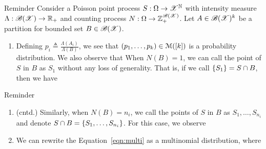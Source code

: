 \documentclass[12pt,aspectratio=169]{beamer}
\begin{document}
\begin{frame}
\begin{block}{Reminder}
Consider a Poisson point process $S:\Omega\to\mathscr{X}^{\mathbb{N}}$ with intensity measure $\Lambda: \mathscr{B}(\mathscr{X}) \to \mathbb{R}_+$ and counting process $N:\Omega\to\mathbb{Z}_+^{\mathscr{B}(\mathscr{X})}$. 
Let $A \in \mathscr{B}(\mathscr{X})^k$ be a partition for bounded set $B \in \mathscr{B}(\mathscr{X})$.  
\begin{enumerate}[i\_]
\item Defining $p_i \triangleq \frac{\Lambda(A_i)}{\Lambda(B)}$, we see that $(p_1, \dots, p_k) \in \mathcal{M}([k])$ is a probability distribution. %
We also observe that 
When $N(B)=1$, we can call the point of $S$ in $B$ as $S_1$ without any loss of generality. 
That is, if we call $\left\{S_1\right\} = S \cap B$, then we have 
\end{enumerate}
\end{block}
\end{frame}

\begin{frame}
\begin{block}{Reminder}
\begin{enumerate}[i\_]
\item (cntd.) Similarly, when $N(B) = n_i$, 
we call the points of $S$ in $B$ as $S_1, \dots, S_{n_i}$ and denote $S\cap B = \left\{S_1, \dots, S_{n_i}\right\}$. 
For this case,  we observe

\item We can rewrite the Equation~\eqref{eqn:multi} as a multinomial distribution, where 
\end{enumerate}
\end{block}
\end{frame}
\end{document}
